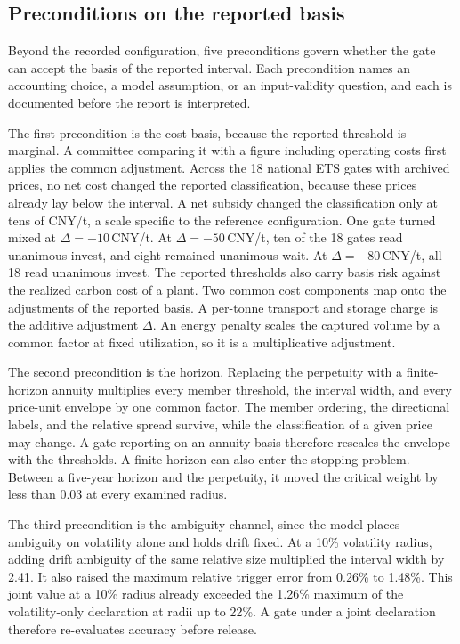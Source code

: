 \documentclass[5p,times,authoryear]{elsarticle}
\theoremstyle{plain}
\begin{document}
\subsection{Preconditions on the reported basis}

Beyond the recorded configuration, five preconditions govern whether the gate can accept the basis of the reported interval. Each precondition names an accounting choice, a model assumption, or an input-validity question, and each is documented before the report is interpreted.

The first precondition is the cost basis, because the reported threshold is marginal. A committee comparing it with a figure including operating costs first applies the common adjustment. Across the 18 national ETS gates with archived prices, no net cost changed the reported classification, because these prices already lay below the interval. A net subsidy changed the classification only at tens of CNY/t, a scale specific to the reference configuration. One gate turned mixed at $\Delta=-10$\,CNY/t. At $\Delta=-50$\,CNY/t, ten of the 18 gates read unanimous invest, and eight remained unanimous wait. At $\Delta=-80$\,CNY/t, all 18 read unanimous invest. The reported thresholds also carry basis risk against the realized carbon cost of a plant. Two common cost components map onto the adjustments of the reported basis. A per-tonne transport and storage charge is the additive adjustment $\Delta$. An energy penalty scales the captured volume by a common factor at fixed utilization, so it is a multiplicative adjustment.

The second precondition is the horizon. Replacing the perpetuity with a finite-horizon annuity multiplies every member threshold, the interval width, and every price-unit envelope by one common factor. The member ordering, the directional labels, and the relative spread survive, while the classification of a given price may change. A gate reporting on an annuity basis therefore rescales the envelope with the thresholds. A finite horizon can also enter the stopping problem. Between a five-year horizon and the perpetuity, it moved the critical weight by less than 0.03 at every examined radius.

The third precondition is the ambiguity channel, since the model places ambiguity on volatility alone and holds drift fixed. At a 10\% volatility radius, adding drift ambiguity of the same relative size multiplied the interval width by 2.41. It also raised the maximum relative trigger error from 0.26\% to 1.48\%. This joint value at a 10\% radius already exceeded the 1.26\% maximum of the volatility-only declaration at radii up to 22\%. A gate under a joint declaration therefore re-evaluates accuracy before release.
\end{document}
